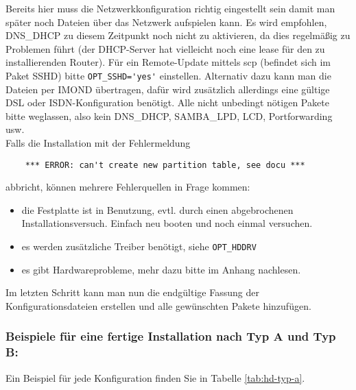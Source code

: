     Bereits hier muss die Netzwerkkonfiguration richtig eingestellt sein damit man später 
    noch Dateien über das Netzwerk aufspielen kann. Es wird empfohlen, DNS\_DHCP zu diesem 
    Zeitpunkt noch nicht zu aktivieren, da dies regelmäßig zu Problemen führt (der DHCP-Server 
    hat vielleicht noch eine lease für den zu installierenden Router). Für ein Remote-Update mittels scp 
    (befindet sich im Paket SSHD) bitte \verb*?OPT_SSHD='yes'? einstellen. Alternativ dazu 
    kann man die Dateien per IMOND übertragen, dafür wird zusätzlich allerdings eine gültige 
    DSL oder ISDN-Konfiguration benötigt.
    Alle nicht unbedingt nötigen Pakete bitte weglassen, also kein DNS\_DHCP, SAMBA\_LPD, LCD,
    Portforwarding usw.\\

    Falls die Installation mit der Fehlermeldung
\begin{example}
\begin{verbatim}
    *** ERROR: can't create new partition table, see docu ***
\end{verbatim}
\end{example}
       abbricht, können mehrere Fehlerquellen in Frage kommen:
        \begin{itemize}
        \item die Festplatte ist in Benutzung, evtl. durch einen abgebrochenen
        Installationsversuch. Einfach neu booten und noch einmal versuchen.
        \item es werden zusätzliche Treiber benötigt, siehe \verb*?OPT_HDDRV?
        \item es gibt Hardwareprobleme, mehr dazu bitte im Anhang nachlesen.
        \end{itemize}
    Im letzten Schritt kann man nun die endgültige Fassung der
    Konfigurationsdateien erstellen und alle gewünschten Pakete hinzufügen.

\subsubsection{Beispiele für eine fertige Installation nach Typ A und Typ B:}

Ein Beispiel für jede Konfiguration finden Sie in Tabelle
\ref{tab:hd-typ-a}.

